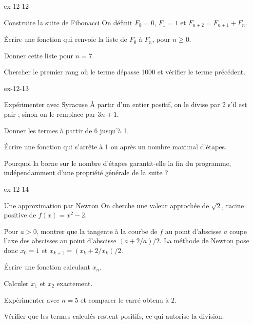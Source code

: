 \clearpage
{}
\begin{blocLivre}{ex-12-12}
\begin{exercice}[3]{Construire la suite de Fibonacci}
On définit $F_0=0$, $F_1=1$ et $F_{n+2}=F_{n+1}+F_n$.\begin{questions}
\item Écrire une fonction qui renvoie la liste de $F_0$ à $F_n$, pour $n\geq0$.
\item Donner cette liste pour $n=7$.
\item Chercher le premier rang où le terme dépasse 1000 et vérifier le terme précédent.
\end{questions}
\end{exercice}
\end{blocLivre}
\begin{blocLivre}{ex-12-13}
\begin{exercice}[3]{Expérimenter avec Syracuse}
À partir d’un entier positif, on le divise par 2 s’il est pair ; sinon on le remplace par $3n+1$.\begin{questions}
\item Donner les termes à partir de 6 jusqu’à 1.
\item Écrire une fonction qui s’arrête à 1 ou après un nombre maximal d’étapes.
\item Pourquoi la borne sur le nombre d’étapes garantit-elle la fin du programme, indépendamment d’une propriété générale de la suite ?
\end{questions}
\end{exercice}
\end{blocLivre}
\begin{blocLivre}{ex-12-14}
\begin{exercice}[3]{Une approximation par Newton}
On cherche une valeur approchée de $\sqrt2$, racine positive de $f(x)=x^2-2$.\begin{questions}
\item Pour $a>0$, montrer que la tangente à la courbe de $f$ au point d’abscisse $a$ coupe l’axe des abscisses au point d’abscisse $(a+2/a)/2$. La méthode de Newton pose donc $x_0=1$ et $x_{k+1}=(x_k+2/x_k)/2$.
\item Écrire une fonction calculant $x_n$.
\item Calculer $x_1$ et $x_2$ exactement.
\item Expérimenter avec $n=5$ et comparer le carré obtenu à 2.
\item Vérifier que les termes calculés restent positifs, ce qui autorise la division.
\end{questions}
\end{exercice}
\end{blocLivre}
